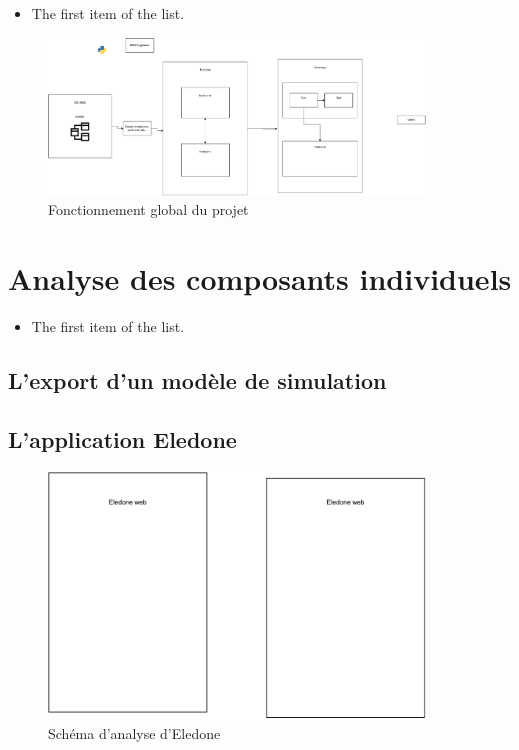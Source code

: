 \documentclass{rapport_stage}
\begin{document}
\begin{itemize}[label=$\bullet$]
  \item The first item of the list.
\end{itemize}

\begin{figure}[ht]
  \centering
  \includegraphics[width=10cm]{figures/architecture_global.pdf}
  \caption{Fonctionnement global du projet}
  \label{fig:fonctionnement-lobal-projet}
\end{figure}

\chapter{Analyse des composants individuels}

\begin{itemize}[label=$\bullet$]
  \item The first item of the list.
\end{itemize}

\section{L'export d'un modèle de simulation}

\section{L'application Eledone}

\begin{figure}[ht]
  \centering
  \includegraphics[width=10cm]{figures/eledone.pdf}
  \caption{Schéma d'analyse d'Eledone}
  \label{fig:analyse-eledone}
\end{figure}
\end{document}
